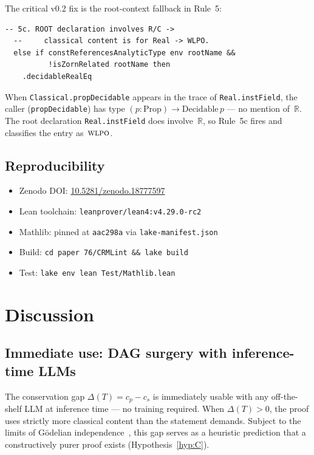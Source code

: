 \documentclass[12pt, a4paper]{article}
\theoremstyle{plain}
\theoremstyle{definition}
\theoremstyle{remark}
\newcommand{\WLPO}{\textsc{wlpo}}
\begin{document}
The critical v0.2 fix is the root-context fallback in Rule~5:

\begin{lstlisting}[caption={Rule 5c: root-context fallback for generic classical constants.}]
  -- 5c. ROOT declaration involves R/C ->
  --     classical content is for Real -> WLPO.
  else if constReferencesAnalyticType env rootName &&
          !isZornRelated rootName then
    .decidableRealEq
\end{lstlisting}

When \texttt{Classical.propDecidable} appears in the trace of
\texttt{Real.instField}, the caller (\texttt{propDecidable}) has
type $(p : \mathrm{Prop}) \to \mathrm{Decidable}\,p$ --- no mention
of~$\mathbb{R}$.  The root declaration \texttt{Real.instField} does
involve~$\mathbb{R}$, so Rule~5c fires and classifies the entry
as~$\WLPO$.

\subsection{Reproducibility}

\begin{itemize}[nosep]
\item Zenodo DOI: \href{https://doi.org/10.5281/zenodo.18777597}{10.5281/zenodo.18777597}
\item Lean toolchain: \texttt{leanprover/lean4:v4.29.0-rc2}
\item Mathlib: pinned at \texttt{aac298a} via \texttt{lake-manifest.json}
\item Build: \texttt{cd paper\ 76/CRMLint \&\& lake build}
\item Test: \texttt{lake env lean Test/Mathlib.lean}
\end{itemize}


\section{Discussion}\label{sec:discussion}

\subsection{Immediate use: DAG surgery with inference-time LLMs}

The conservation gap $\Delta(T) = c_p - c_s$ is immediately usable
with any off-the-shelf LLM at inference time --- no training required.
When $\Delta(T) > 0$, the proof uses strictly more classical content
than the statement demands.  Subject to the limits of G\"odelian
independence~\cite{paris-harrington}, this gap serves as a heuristic
prediction that a constructively purer proof exists
(Hypothesis~\ref{hyp:C}).
\end{document}
